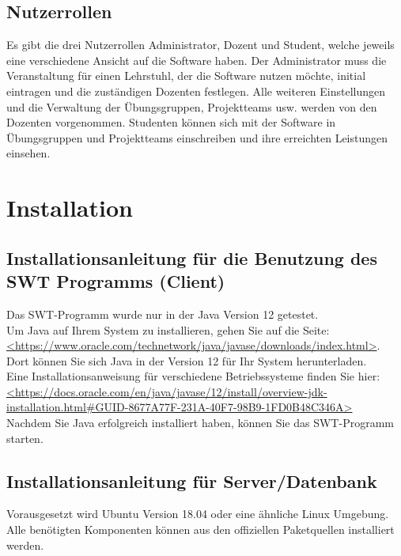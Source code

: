 \documentclass{Handbuch}
\begin{document}
\subsection{Nutzerrollen}
Es gibt die drei Nutzerrollen Administrator, Dozent und Student, welche jeweils eine verschiedene Ansicht auf die Software haben.
Der Administrator muss die Veranstaltung für einen Lehrstuhl, der die Software nutzen möchte, initial eintragen und die zuständigen Dozenten festlegen.
Alle weiteren Einstellungen und die Verwaltung der Übungsgruppen, Projektteams usw. werden von den Dozenten vorgenommen.
Studenten können sich mit der Software in Übungsgruppen und Projektteams einschreiben und ihre erreichten Leistungen einsehen.


\newpage
\section{Installation}
\subsection{Installationsanleitung für die Benutzung des SWT Programms (Client)}
Das SWT-Programm wurde nur in der Java Version 12 getestet.\\
Um Java auf Ihrem System zu installieren, gehen Sie auf die Seite: \url{<https://www.oracle.com/technetwork/java/javase/downloads/index.html>}.\\
Dort können Sie sich Java in der Version 12 für Ihr System herunterladen.\\
Eine Installationsanweisung für verschiedene Betriebssysteme finden Sie hier:\\
\url{<https://docs.oracle.com/en/java/javase/12/install/overview-jdk-installation.html#GUID-8677A77F-231A-40F7-98B9-1FD0B48C346A>}\\

Nachdem Sie Java erfolgreich installiert haben, können Sie das SWT-Programm starten.

\subsection{Installationsanleitung für Server/Datenbank}
Vorausgesetzt wird Ubuntu Version 18.04 oder eine ähnliche Linux Umgebung.\\

Alle benötigten Komponenten können aus den offiziellen Paketquellen installiert werden.\\
\end{document}
